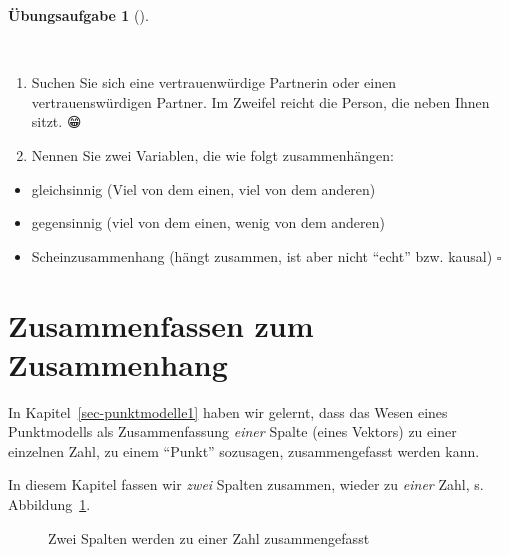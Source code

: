 \documentclass[
  letterpaper,
]{scrbook}
\providecommand{\tightlist}{%
  \setlength{\itemsep}{0pt}\setlength{\parskip}{0pt}}\usepackage{longtable,booktabs,array}
\theoremstyle{definition}
\newtheorem{exercise}{Übungsaufgabe}[chapter]
\theoremstyle{definition}
\theoremstyle{definition}
\theoremstyle{remark}
\begin{document}
\begin{exercise}[]\protect\hypertarget{exr-zsgh-studis}{}\label{exr-zsgh-studis}

~

\begin{enumerate}
\def\labelenumi{\arabic{enumi}.}
\tightlist
\item
  Suchen Sie sich eine vertrauenwürdige Partnerin oder einen
  vertrauenswürdigen Partner. Im Zweifel reicht die Person, die neben
  Ihnen sitzt. {😁}
\item
  Nennen Sie zwei Variablen, die wie folgt zusammenhängen:
\end{enumerate}

\begin{itemize}
\tightlist
\item
  gleichsinnig (Viel von dem einen, viel von dem anderen)
\item
  gegensinnig (viel von dem einen, wenig von dem anderen)
\item
  Scheinzusammenhang (hängt zusammen, ist aber nicht \enquote{echt} bzw.
  kausal) \(\square\)
\end{itemize}

\end{exercise}

\section{Zusammenfassen zum
Zusammenhang}\label{zusammenfassen-zum-zusammenhang}

In Kapitel~\ref{sec-punktmodelle1} haben wir gelernt, dass das Wesen
eines Punktmodells als Zusammenfassung \emph{einer} Spalte (eines
Vektors) zu einer einzelnen Zahl, zu einem \enquote{Punkt} sozusagen,
zusammengefasst werden kann.

In diesem Kapitel fassen wir \emph{zwei} Spalten zusammen, wieder zu
\emph{einer} Zahl, s. Abbildung~\ref{fig-desk2}.

\begin{figure}


\caption{\label{fig-desk2}Zwei Spalten werden zu einer Zahl
zusammengefasst}

\end{figure}%
\end{document}
